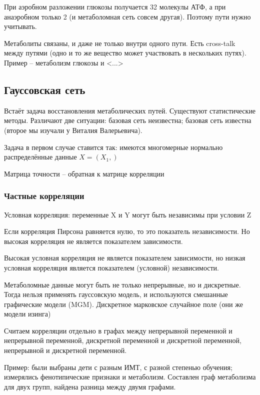 \documentclass[main.tex]{subfiles}
\begin{document}
При аэробном разложении глюкозы получается 32 молекулы АТФ, а при анаэробном только 2 (и метаболомная сеть совсем другая).
Поэтому пути нужно учитывать.

Метаболиты связаны, и даже не только внутри одного пути.
Есть cross-talk между путями (одно и то же вещество может участвовать в нескольких путях).
Пример -- метаболизм глюкозы и <...>

\subsection{Гауссовская сеть}

Встаёт задача восстановления метаболических путей.
Существуют статистические методы.
Различают две ситуации: базовая сеть неизвестна; базовая сеть известна (второе мы изучали у Виталия Валерьевича).

Задача в первом случае ставится так: имеются многомерные нормально распределённые данные $ X = (X_1, ) $ %

Матрица точности -- обратная к матрице корреляции

\subsubsection{Частные корреляции}


Условная корреляция: переменные X и Y могут быть независимы при условии Z

Если корреляция Пирсона равняется нулю, то это показатель независимости.
Но высокая корреляция не является показателем зависимости.

Высокая условная корреляция не является показателем зависимости, но низкая условная корреляция является показателем (условной) независимости.


Метаболомные данные могут быть не только непрерывные, но и дискретные.
Тогда нельзя применять гауссовскую модель, и используются смешанные графические модели (MGM).
Дискретное марковское случайное поле (они же модели изинга)

Считаем корреляции отдельно в графах между непрерывной переменной и непрерывной переменной, дискретной переменной и дискретной переменной, непрерывной и дискретной переменной.

Пример: были выбраны дети с разным ИМТ, с разной степенью обучения; измерялись фенотипические признаки и метаболизм.
Составлен граф метаболизма для двух групп, найдена разница между двумя графами.
\end{document}
